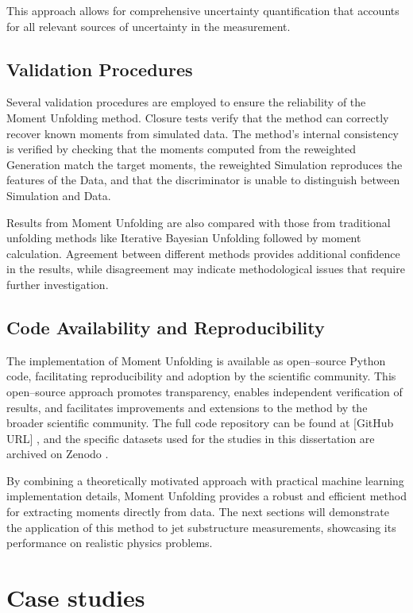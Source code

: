         This approach allows for comprehensive uncertainty quantification that accounts for all relevant sources of uncertainty in the measurement.
    \subsection{Validation Procedures}
        Several validation procedures are employed to ensure the reliability of the Moment Unfolding method.
        Closure tests verify that the method can correctly recover known moments from simulated data.
        The method's internal consistency is verified by checking that the moments computed from the reweighted Generation match the target moments,
        the reweighted Simulation reproduces the features of the Data, and
        that the discriminator is unable to distinguish between Simulation and Data.
        
        Results from Moment Unfolding are also compared with those from traditional unfolding methods like Iterative Bayesian Unfolding followed by moment calculation.
        Agreement between different methods provides additional confidence in the results, while disagreement may indicate methodological issues that require further investigation.
    \subsection{Code Availability and Reproducibility}
        The implementation of Moment Unfolding is available as open--source Python code, facilitating reproducibility and adoption by the scientific community.
        This open--source approach promotes transparency, enables independent verification of results, and facilitates improvements and extensions to the method by the broader scientific community.
        The full code repository can be found at [GitHub URL] , and the specific datasets used for the studies in this dissertation are archived on Zenodo .

    By combining a theoretically motivated approach with practical machine learning implementation details, Moment Unfolding provides a robust and efficient method for extracting moments directly from data.
    The next sections will demonstrate the application of this method to jet substructure measurements, showcasing its performance on realistic physics problems.
    
\section{Case studies}
